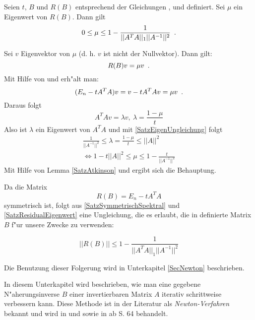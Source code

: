 \begin{satz}
\label{SatzResidualEigenwert}
    Seien $t$, $B$ und $R(B)$ entsprechend der Gleichungen
    ,  und 
    definiert. Sei $\mu$ ein Eigenwert von $R(B)$. Dann
    gilt
    \[
        0 \leq \mu \leq
        1- \frac{ 1
                }{ ||A^T A||_1 ||A^{-1}||^2
                } \mbox{\hspace{0.5em}.}
    \]
\end{satz}
\begin{beweis}
    Sei $v$ Eigenvektor von $\mu$ (d. h. $v$ ist nicht der Nullvektor).
    Dann gilt:
    \[ R(B)v = \mu v \mbox{\hspace{0.5em}.} \]
    Mit Hilfe von  und 
    erh"alt man:
    \[ (E_n - t A^T A)v = v - tA^TA v = \mu v \mbox{\hspace{0.5em}.} \]
    Daraus folgt
    \[ A^T A v = \lambda v, \: \lambda = \frac{ 1-\mu }{ t } \]
    Also ist $\lambda$ ein Eigenwert von $A^T A$ und mit
    \ref{SatzEigenUngleichung} folgt
    \begin{eqnarray*}
        \frac{ 1 }{ ||A^{-1}||^2
             } \leq \lambda =
            \frac{ 1 - \mu }{ t } \leq ||A||^2 \\
        \Leftrightarrow
            1 - t||A||^2 \leq \mu \leq 1 - \frac{ t }{ ||A^{-1}||^2 }
    \end{eqnarray*}
    Mit Hilfe von Lemma \ref{SatzAtkinson} und 
    ergibt sich die Behauptung.
\end{beweis}

Da die Matrix \[ R(B) = E_n - tA^T A \] symmetrisch ist, folgt aus
\ref{SatzSymmetrischSpektral} und \ref{SatzResidualEigenwert} eine
Ungleichung, die es erlaubt, die in  definierte Matrix 
$B$ f"ur unsere Zwecke zu verwenden:
\begin{korollar}
\label{SatzNormNaheInvers}
    \[
        ||R(B)|| \leq
            1-\frac{ 1
                   }{ ||A^T A||_1 ||A^{-1}||^2
                   }
    \]
\end{korollar}
Die Benutzung dieser Folgerung wird in Unterkapitel \ref{SecNewton}
beschrieben.


\label{SecNewton}
  

In diesem Unterkapitel wird beschrieben, wie man eine gegebene 
N"aherungsinverse $B$ einer invertierbaren Matrix $A$ iterativ schrittweise
verbessern kann. Diese Methode ist in der Literatur als
{\em Newton-Verfahren} bekannt und wird in
\cite{PR85} und \cite{PR85a} sowie in \cite{Hous64} ab S. 64
behandelt. 

